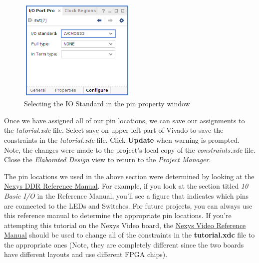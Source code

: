 \documentclass[11pt]{article}
\begin{document}
\begin{figure}[!h]
    \centering
    \includegraphics[width=0.5\textwidth]{images/io_std.png}
    \caption{Selecting the IO Standard in the pin property window}
    \label{fig:io_std}
\end{figure}

Once we have assigned all of our pin locations, we can save our assignments to the \textit{tutorial.xdc} file. Select save on upper left part of Vivado to save the constraints in the \textit{tutorial.xdc} file. Click \textbf{Update} when warning is prompted. Note, the changes were made to the project's local copy of the \textit{constraints.xdc} file. Close the \textit{Elaborated Design} view to return to the \textit{Project Manager}.

The pin locations we used in the above section were determined by looking at the \href{https://reference.digilentinc.com/reference/programmable-logic/nexys-4-ddr/reference-manual}{Nexys DDR Reference Manual}. For example, if you look at the section titled \textit{10 Basic I/O} in the Reference Manual, you'll see a figure that indicates which pins are connected to the LEDs and Switches. For future projects, you can always use this reference manual to determine the appropriate pin locations. If you're attempting this tutorial on the Nexys Video board, the \href{https://reference.digilentinc.com/reference/programmable-logic/nexys-video/reference-manual}{Nexys Video Reference Manual} should be used to change all of the constraints in the \textbf{tutorial.xdc} file to the appropriate ones (Note, they are completely different since the two boards have different layouts and use different FPGA chips).
\end{document}
